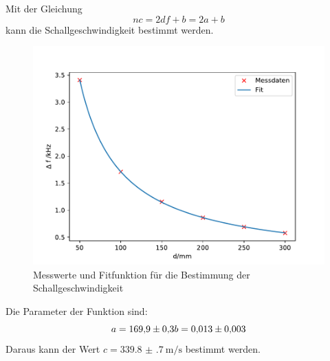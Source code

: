 Mit der Gleichung 
\begin{equation*}
    nc = 2df +b =2a+b
\end{equation*}
kann die Schallgeschwindigkeit bestimmt werden.
\FloatBarrier
\begin{figure}
    \caption{Messwerte und Fitfunktion für die Bestimmung der Schallgeschwindigkeit}
\includegraphics[width = \textwidth]{figure/Schallgeschwindigkeit.pdf}
\end{figure}
\FloatBarrier
Die Parameter der Funktion sind:
\begin{equation*}
    a= \num{169.9(3)}\\
    b= \num{0.013(3)}
\end{equation*}
Daraus kann der Wert $c=\SI{339.8(7)}{\meter\per\second}$ bestimmt werden.

